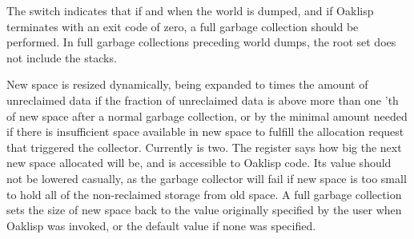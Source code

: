 The  switch indicates that if and when the world is dumped, and
if Oaklisp terminates with an exit code of zero, a full garbage
collection should be performed.  In full garbage collections preceding
world dumps, the root set does not include the stacks.

New space is resized dynamically, being expanded to
 times the amount of unreclaimed data if
the fraction of unreclaimed data is above more than one
'th of new space after a normal garbage
collection, or by the minimal amount needed if there is insufficient
space available in new space to fulfill the allocation request that
triggered the collector.  Currently  is
two.  The  register says how
big the next new space allocated will be, and is accessible to Oaklisp
code.  Its value should not be lowered casually, as the garbage
collector will fail if new space is too small to hold all of the
non-reclaimed storage from old space.  A full garbage collection sets
the size of new space back to the value originally specified by the
user when Oaklisp was invoked, or the default value if none was
specified.
